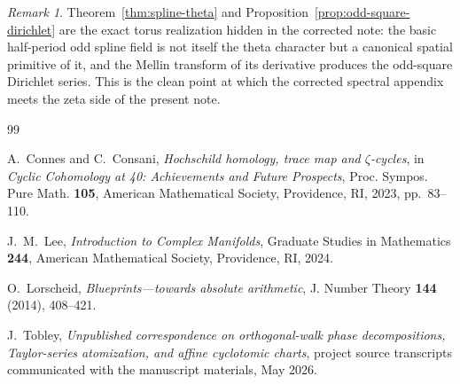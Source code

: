\documentclass[11pt,a4paper]{article}
\numberwithin{equation}{section}
\theoremstyle{definition}
\theoremstyle{remark}
\newtheorem{remark}[theorem]{Remark}
\begin{document}
\begin{remark}
Theorem~\ref{thm:spline-theta} and Proposition~\ref{prop:odd-square-dirichlet} are the exact torus realization hidden in the corrected note: the basic half-period odd spline field is not itself the theta character but a canonical spatial primitive of it, and the Mellin transform of its derivative produces the odd-square Dirichlet series.  This is the clean point at which the corrected spectral appendix meets the zeta side of the present note.
\end{remark}

\begin{thebibliography}{99}

A.~Connes and C.~Consani,
\emph{Hochschild homology, trace map and $\zeta$-cycles},
in \emph{Cyclic Cohomology at 40: Achievements and Future Prospects},
Proc. Sympos. Pure Math. \textbf{105}, American Mathematical Society, Providence, RI, 2023, pp.~83--110.

J.~M.~Lee,
\emph{Introduction to Complex Manifolds},
Graduate Studies in Mathematics \textbf{244}, American Mathematical Society, Providence, RI, 2024.

O.~Lorscheid,
\emph{Blueprints---towards absolute arithmetic},
J. Number Theory \textbf{144} (2014), 408--421.

J.~Tobley,
\emph{Unpublished correspondence on orthogonal-walk phase decompositions, Taylor-series atomization, and affine cyclotomic charts},
project source transcripts communicated with the manuscript materials, May 2026.

\end{thebibliography}
\end{document}
